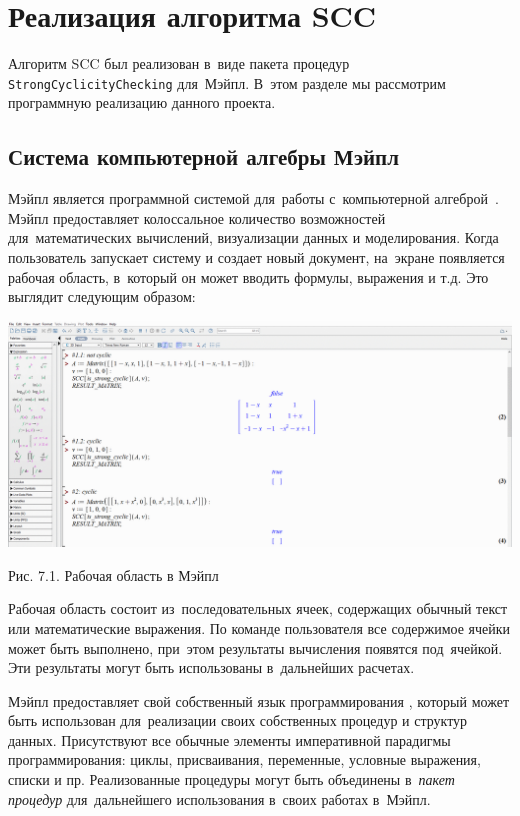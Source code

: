 \section{Реализация алгоритма SCC}

Алгоритм SCC был реализован в~виде пакета процедур \verb|StrongCyclicityChecking| для~Мэйпл.
В~этом разделе мы рассмотрим программную реализацию данного проекта.


\subsection{Система компьютерной алгебры Мэйпл}

Мэйпл является программной системой для~работы с~компьютерной алгеброй~\cite{litMapleHelp}.
Мэйпл предоставляет колоссальное количество возможностей для~математических вычислений, визуализации данных и моделирования.
Когда пользователь запускает систему и создает новый документ,
на~экране появляется рабочая область, в~который он может вводить формулы, выражения и т.д.
Это выглядит следующим образом:

\begin{center}
    \includegraphics[scale=0.3]{pictures/maple_workarea.png}

    \small
    Рис. 7.1. Рабочая область в Мэйпл
\end{center}

Рабочая область состоит из~последовательных ячеек, содержащих обычный текст или математические выражения.
По команде пользователя все содержимое ячейки может быть выполнено, при~этом результаты вычисления появятся под~ячейкой.
Эти результаты могут быть использованы в~дальнейших расчетах.

Мэйпл предоставляет свой собственный язык программирования \cite{litMapleGuide2011, litMapleGuide2021},
который может быть использован для~реализации своих собственных процедур и структур данных.
Присутствуют все обычные элементы императивной парадигмы программирования:
циклы, присваивания, переменные, условные выражения, списки и пр.
Реализованные процедуры могут быть объединены в~\emph{пакет процедур}
для~дальнейшего использования в~своих работах в~Мэйпл.

